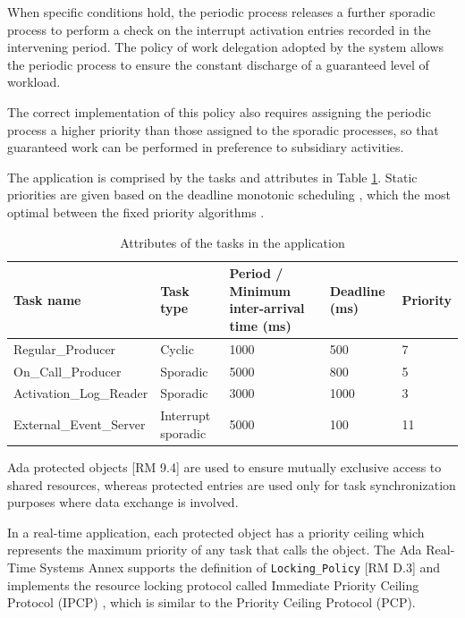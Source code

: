 \documentclass{article}
\begin{document}
When specific conditions hold, the periodic process releases a further sporadic process to perform a check on the interrupt activation entries recorded in the intervening period. The policy of work delegation adopted by the system allows the periodic process to ensure the constant discharge of a guaranteed level of workload.

The correct implementation of this policy also requires assigning the periodic process a higher priority than those assigned to the sporadic processes, so that guaranteed work can be performed in preference to subsidiary activities.

The application is comprised by the tasks and attributes in Table \ref{tab:tasks-attributes}. Static priorities are given based on the deadline monotonic scheduling \cite{rm-dm}, which the most optimal between the fixed priority algorithms \cite{optimality-rm-dm}.

\begin{table}[!htbp]
   \centering
   \begin{tabular}{lllll}
     \toprule
     Task name & Task type & Period / Minimum inter-arrival time (ms) & Deadline (ms) & Priority  \\
     \midrule
     Regular\_Producer & Cyclic & 1000 & 500 & 7 \\
     On\_Call\_Producer & Sporadic & 5000 & 800 & 5 \\
     Activation\_Log\_Reader & Sporadic & 3000 & 1000 & 3 \\
     External\_Event\_Server & Interrupt sporadic & 5000 & 100 & 11 \\
     \bottomrule
   \end{tabular}
   \caption{Attributes of the tasks in the application \cite{ycs}}
   \label{tab:tasks-attributes}
\end{table}

Ada protected objects [RM 9.4] are used to ensure mutually exclusive access to shared resources, whereas protected entries are used only for task synchronization purposes where data exchange is involved.

In a real-time application, each protected object has a priority ceiling which represents the maximum priority of any task that calls the object. The Ada Real-Time Systems Annex supports the definition of  \texttt{Locking\_Policy} [RM D.3] and implements the resource locking protocol called Immediate Priority Ceiling Protocol (IPCP) \cite{ada-pcp}, which is similar to the Priority Ceiling Protocol (PCP).
\end{document}
